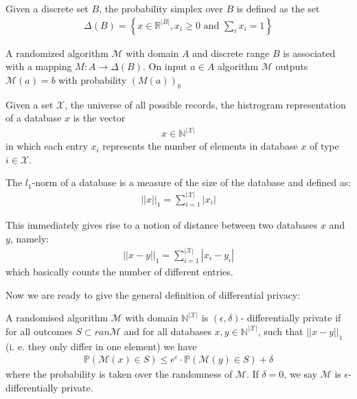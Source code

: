 \begin{definition}
    Given a discrete set $B$, the probability simplex over $B$ is defined as the set
    \begin{align}
        \Delta(B) = \left\{ x \in \mathbb{R}^{|B|}, x_i \ge 0 \text{ and } \sum_i x_i = 1  \right\}
    \end{align}
\end{definition}

\begin{definition}
    A randomized algorithm $\mathcal{M}$ with domain $A$ and discrete range $B$ is associated with a mapping $M: A \rightarrow \Delta(B)$. On input $a\in A$ algorithm $\mathcal{M}$ outputs $\mathcal{M}(a)=b$ with probability $(M(a))_b$
\end{definition}

\begin{definition}
        Given a set $\mathcal{X}$, the universe of all possible records, the histrogram representation of a database $x$ is the vector
        \begin{align}
            x \in \mathbb{N}^{|\mathcal{X}|}
        \end{align}
       in which each entry $x_i$ represents the number of elements in database $x$ of type $i\in \mathcal{X}$.
\end{definition}


\begin{definition}
    The $l_1$-norm of a database is a measure of the size of the database and defined as:
    \begin{align}
        ||x||_1 = \sum_{i=1}^{|\mathcal{X}|} |x_i|
    \end{align}
\end{definition}

This immediately gives rise to a notion of distance between two databases $x$ and $y$, namely:
\begin{align}
    ||x-y||_1   = \sum_{i=1}^{|\mathcal{X}|} |x_i-y_i|
\end{align}
which basically counts the number of different entries.

Now we are ready to give the general definition of differential privacy:
\begin{definition}
    A randomised algorithm $\mathcal{M}$ with domain $\mathbb{N}^{|\mathcal{X}|}$ is $(\epsilon, \delta)$- differentially private if for all outcomes $S \subset ran \mathcal{M}$ and for all databases $x,y \in \mathbb{N}^{|\mathcal{X}|}$, such that $||x-y||_1$ (i. e. they only differ in one element) we have
    \begin{align}
        \mathbb{P}(\mathcal{M}(x) \in S) \le e^\epsilon \cdot \mathbb{P}(\mathcal{M}(y) \in S) + \delta 
    \end{align}
    where the probability is taken over the randomness of $\mathcal{M}$. If $\delta=0$, we say $\mathcal{M}$ is $\epsilon$-differentially private.
\end{definition}

